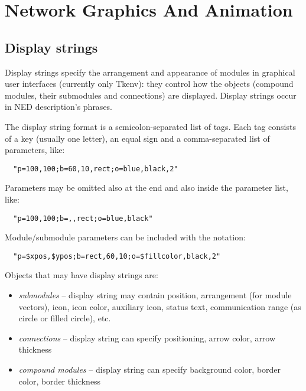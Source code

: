 \chapter{Network Graphics And Animation}
\label{cha:graphics}

\section{Display strings}
\label{sec:ch-ned-lang:display-strings}


Display strings specify the arrangement and
appearance of modules in graphical user interfaces (currently only
Tkenv): they control how the objects (compound modules, their
submodules and connections) are displayed. Display strings occur in
NED description's 
phrases.

The display string format is a semicolon-separated list of tags.
Each tag consists of a key (usually one letter), an equal sign
and a comma-separated list of parameters, like:

\begin{verbatim}
  "p=100,100;b=60,10,rect;o=blue,black,2"
\end{verbatim}

Parameters may be omitted also at the end and also inside the
parameter list, like:

\begin{verbatim}
  "p=100,100;b=,,rect;o=blue,black"
\end{verbatim}

Module/submodule parameters can be included with the  notation:

\begin{verbatim}
  "p=$xpos,$ypos;b=rect,60,10;o=$fillcolor,black,2"
\end{verbatim}

Objects that may have display strings are:
\begin{itemize}
  \item \textit{submodules} -- display string may contain position, arrangement
        (for module vectors), icon, icon color, auxiliary icon, status text,
        communication range (as circle or filled circle), etc.
  \item \textit{connections} -- display string can specify positioning, arrow color,
        arrow thickness
  \item \textit{compound modules} -- display string can specify background color,
        border color, border thickness
\end{itemize}

